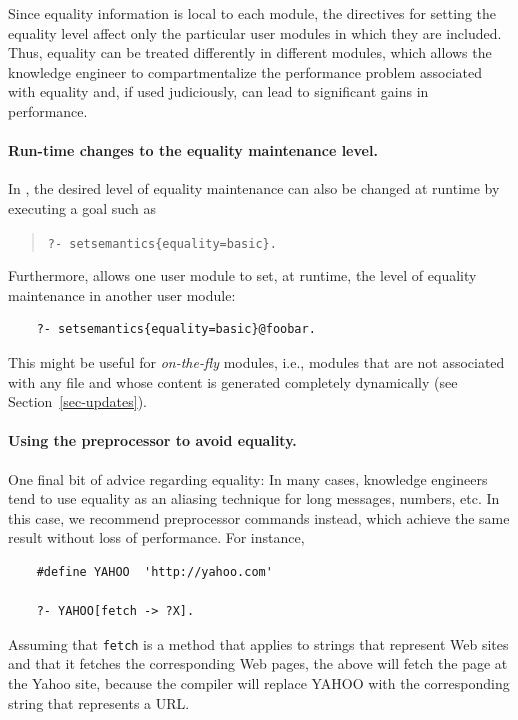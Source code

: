 \documentclass[11pt]{article}
\newcommand{\ERGO}{\mbox{\smaller{\ensuremath{\cal{E}}\smaller{{\sc{RGO}}}}}\xspace}
\newcommand{\FLSYSTEM}{\ERGO}
\begin{document}
Since equality information is local to each module, the directives for
setting the equality level affect only the particular user modules in which
they are included.  Thus, equality can be treated differently in different
modules, which allows the knowledge engineer to compartmentalize the performance
problem associated with equality and, if used judiciously, can lead to
significant gains in performance.

\paragraph{Run-time changes to the equality maintenance level.}
In \FLSYSTEM, the desired level of equality maintenance can also be changed at
runtime by executing a goal such as
\begin{quote}
 {\tt ?- setsemantics\{equality=basic\}.}
\end{quote}
Furthermore, \FLSYSTEM allows one user module to set, at runtime, the level
of equality maintenance in another user module:
\begin{verbatim}
    ?- setsemantics{equality=basic}@foobar.
\end{verbatim}
This might be useful for \emph{on-the-fly} modules, i.e., modules that
are not associated with any file and whose content is generated completely
dynamically (see Section~\ref{sec-updates}).

\paragraph{Using the preprocessor to avoid equality.}
One final bit of advice regarding equality: In many cases, knowledge
engineers tend to use
equality as an aliasing technique for long messages, numbers, etc. In this
case, we recommend preprocessor commands instead, which achieve the same
result without loss of performance. For instance,

\begin{verbatim}
    #define YAHOO  'http://yahoo.com'  

    ?- YAHOO[fetch -> ?X].
\end{verbatim}
\noindent
Assuming that {\tt fetch} is a method that applies to strings that
represent Web sites and that it fetches the corresponding Web pages, the above
will fetch the page at the Yahoo site, because the \FLSYSTEM compiler will
replace YAHOO with the corresponding string that represents a URL.
\end{document}
